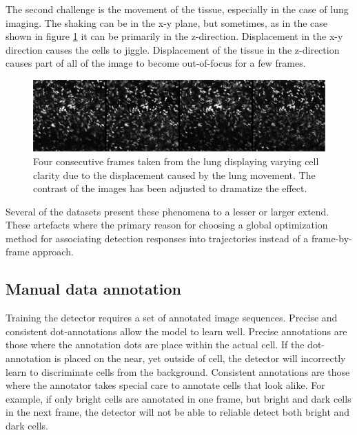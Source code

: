 	The second challenge is the movement of the tissue, especially in the case of lung imaging. The shaking can be in the x-y plane, but sometimes, as in the case shown in figure \cref{fig:data_challenges_movement} it can be primarily in the z-direction. Displacement in the x-y direction causes the cells to jiggle. Displacement of the tissue in the z-direction causes part of all of the image to become out-of-focus for a few frames.
	
	\begin{figure}[h]

		\includegraphics[width=\textwidth]{images/data_challenge_movement}

		\caption{Four consecutive frames taken from the lung displaying varying cell clarity due to the displacement caused by the lung movement. The contrast of the images has been adjusted to dramatize the effect.}
		\label{fig:data_challenges_movement}
	\end{figure}
	
	Several of the datasets present these phenomena to a lesser or larger extend. These artefacts where the primary reason for choosing a global optimization method for associating detection responses into trajectories instead of a frame-by-frame approach.
	
	\subsection{Manual data annotation \statusfirstdraft}
	\label{sec:data_manual_annotation}
	Training the detector requires a set of annotated image sequences. Precise and consistent dot-annotations allow the model to learn well. Precise annotations are those where the annotation dots are place within the actual cell. If the dot-annotation is placed on the near, yet outside of cell, the detector will incorrectly learn to discriminate cells from the background. Consistent annotations are those where the annotator takes special care to annotate cells that look alike. For example, if only bright cells are annotated in one frame, but bright and dark cells in the next frame, the detector will not be able to reliable detect both bright and dark cells.
	
